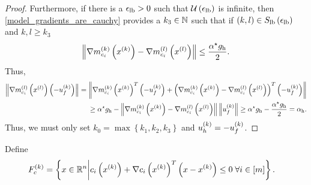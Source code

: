 \begin{proof}
Furthermore, if there is a ${\epsilon_{\textrm{lb}}} > 0$ such that ${\mathcal U\left(\epsilon_{\textrm{lb}}\right)}$ is infinite,
then \cref{model_gradients_are_cauchy} provides a $k_3 \in \mathbb N$ such that if $(k, l) \in {S_{\textrm{lb}}\left(\epsilon_{\textrm{lb}}\right)}$ and $k, l \ge k_3$
\begin{align*}
\left\|{\nabla m_{c_i}^{(k)}\left(x^{(k)}\right)} - {\nabla m_{c_i}^{(l)}\left({x^{(l)}}\right)}\right\| \le \frac {{ \alpha^{\star} } { g_{\textrm{h}} }} {2}.
\end{align*}
Thus,
\begin{align*}
\left\|{\nabla m_{c_i}^{(l)}\left({x^{(l)}}\right)} \left(-{u^{(k)}_f}\right) \right\| = 
\left\|{\nabla m_{c_i}^{(k)}\left(x^{(k)}\right)}^T\left(-{u^{(k)}_f}\right) + \left({\nabla m_{c_i}^{(k)}\left(x^{(k)}\right)} - {\nabla m_{c_i}^{(l)}\left({x^{(l)}}\right)} \right)^T\left(-{u^{(k)}_f}\right)\right\| \\
\ge { \alpha^{\star} } { g_{\textrm{h}} } - \left\|{\nabla m_{c_i}^{(k)}\left(x^{(k)}\right)} - {\nabla m_{c_i}^{(l)}\left({x^{(l)}}\right)} \right\|\left\|{u^{(k)}_f}\right\|
\ge { \alpha^{\star} } { g_{\textrm{h}} } - \frac {{ \alpha^{\star} } { g_{\textrm{h}} }} {2} = { \alpha_{\textrm{h}} }.
\end{align*}
Thus, we must only set $k_0 = \max \left\{k_1, k_2, k_3\right\}$ and ${ u_{h}^{(k)} }=-{u^{(k)}_f}$.
\end{proof}




% 
% 
% 
% 
% 
% 
% 



Define
\begin{align}
{F_c^{(k)}} &= \left\{ x \in \mathbb R^n \bigg| c_i\left(x^{(k)}\right) + \nabla c_i\left(x^{(k)}\right)^T \left(x - x^{(k)}\right) \le 0 \; \forall i \in [m] \right\}. \label{define_truefeasiblek}
\end{align}



